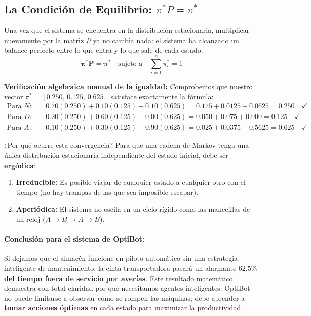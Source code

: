 \subsection*{La Condición de Equilibrio: $\pi^* P = \pi^*$}
Una vez que el sistema se encuentra en la distribución estacionaria, multiplicar nuevamente por la matriz $P$ ya no cambia nada: el sistema ha alcanzado un balance perfecto entre lo que entra y lo que sale de cada estado:
\begin{equation}
  \mathbf{\pi^* P = \pi^*} \quad \text{sujeto a} \quad \sum_{i=1}^n \pi_i^* = 1
\end{equation}

\noindent \textbf{Verificación algebraica manual de la igualdad:}
Comprobemos que nuestro vector $\pi^* = [0.250, \, 0.125, \, 0.625]$ satisface exactamente la fórmula:
\begin{align*}
  \text{Para } N: \quad &0.70(0.250) + 0.10(0.125) + 0.10(0.625) = 0.175 + 0.0125 + 0.0625 = \mathbf{0.250} \quad \checkmark \\[0.4ex]
  \text{Para } D: \quad &0.20(0.250) + 0.60(0.125) + 0.00(0.625) = 0.050 + 0.075 + 0.000 = \mathbf{0.125} \quad \checkmark \\[0.4ex]
  \text{Para } A: \quad &0.10(0.250) + 0.30(0.125) + 0.90(0.625) = 0.025 + 0.0375 + 0.5625 = \mathbf{0.625} \quad \checkmark
\end{align*}

\begin{ideaclave}
¿Por qué ocurre esta convergencia? Para que una cadena de Markov tenga una única distribución estacionaria independiente del estado inicial, debe ser \textbf{ergódica}:
\begin{enumerate}
  \item \textbf{Irreducible:} Es posible viajar de cualquier estado a cualquier otro con el tiempo (no hay trampas de las que sea imposible escapar).
  \item \textbf{Aperiódica:} El sistema no oscila en un ciclo rígido como las manecillas de un reloj ($A \to B \to A \to B$).
\end{enumerate}
\end{ideaclave}

\paragraph{Conclusión para el sistema de OptiBot:}
Si dejamos que el almacén funcione en piloto automático sin una estrategia inteligente de mantenimiento, la cinta transportadora pasará un alarmante \textbf{$62.5\%$ del tiempo fuera de servicio por averías}. Este resultado matemático demuestra con total claridad por qué necesitamos agentes inteligentes: OptiBot no puede limitarse a observar cómo se rompen las máquinas; debe aprender a \textbf{tomar acciones óptimas} en cada estado para maximizar la productividad.

